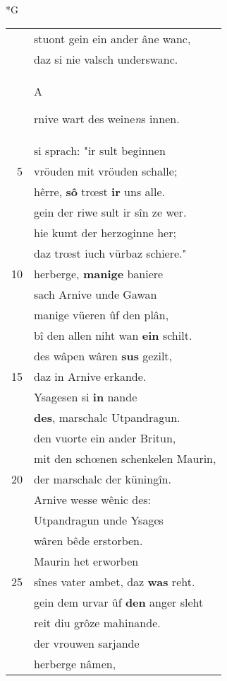 \documentclass[8pt,a4paper,notitlepage]{article}
\begin{document}
\begin{table}[ht]
\begin{minipage}[t]{0.5\linewidth}
\small
\begin{center}*G
\end{center}
\begin{tabular}{rl}
 & stuont gein ein ander âne wanc,\\ 
 & daz si nie valsch underswanc.\\ 
 & \begin{large}A\end{large}rnive wart des weine\textit{n}s innen.\\ 
 & si sprach: "ir sult beginnen\\ 
5 & vröuden mit vröuden schalle;\\ 
 & hêrre, \textbf{sô} trœst \textbf{ir} uns alle.\\ 
 & gein der riwe sult ir sîn ze wer.\\ 
 & hie kumt der herzoginne her;\\ 
 & daz trœst iuch vürbaz schiere."\\ 
10 & herberge, \textbf{manige} baniere\\ 
 & sach Arnive unde Gawan\\ 
 & manige vüeren ûf den plân,\\ 
 & bî den allen niht wan \textbf{ein} schilt.\\ 
 & des wâpen wâren \textbf{sus} gezilt,\\ 
15 & daz in Arnive erkande.\\ 
 & Ysagesen si \textbf{in} nande\\ 
 & \textbf{des}, marschalc Utpandragun.\\ 
 & den vuorte ein ander Britun,\\ 
 & mit den schœnen schenkelen Maurin,\\ 
20 & der marschalc der küningîn.\\ 
 & Arnive wesse wênic des:\\ 
 & Utpandragun unde Ysages\\ 
 & wâren bêde erstorben.\\ 
 & Maurin het erworben\\ 
25 & sînes vater ambet, daz \textbf{was} reht.\\ 
 & gein dem urvar ûf \textbf{den} anger sleht\\ 
 & reit diu grôze mahinande.\\ 
 & der vrouwen sarjande\\ 
 & herberge nâmen,\\ 

\end{tabular}
\end{minipage}
\end{table}
\end{document}
